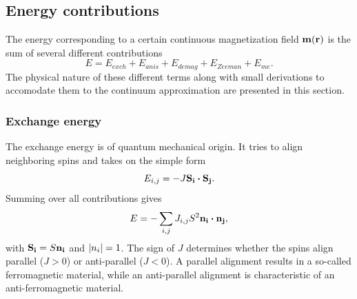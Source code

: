 \documentclass[10pt,a4paper]{article}
\begin{document}
\subsection{Energy contributions}
The energy corresponding to a certain continuous magnetization field $\vb{m}(\vb{r})$ is the sum of several different contributions
\begin{equation}
    E = E_{exch} + E_{anis} + E_{demag} + E_{Zeeman} + E_{me} \mathrm{.} \label{eq:Energy_Terms}
\end{equation}
The physical nature of these different terms along with small derivations to accomodate them to the continuum approximation are presented in this section.
\subsubsection{Exchange energy}
The exchange energy is of quantum mechanical origin. It tries to align neighboring spins and takes on the simple form
\begin{equation}
    E_{i,j} = -J \vb{S_i} \vdot \vb{S_j} \mathrm{.}
    \label{eq:Energy_ExchangeEnergy_Discrete}
\end{equation}
Summing over all contributions gives
\begin{equation}
    E = -\sum_{i,j} J_{i,j} S^2 \vb{n_i} \vdot \vb{n_j} \mathrm{,}
    \label{eq:Energy_ExchangeEnergy_SumDiscrete}
\end{equation}
with $\vb{S_i} = S \vb{n_i}$ and $\abs{n_i} = 1$. 
The sign of $J$ determines whether the spins align parallel ($J>0$) or anti-parallel ($J<0$). A parallel alignment results in a so-called ferromagnetic material, while an anti-parallel alignment is characteristic of an anti-ferromagnetic material.
\end{document}
